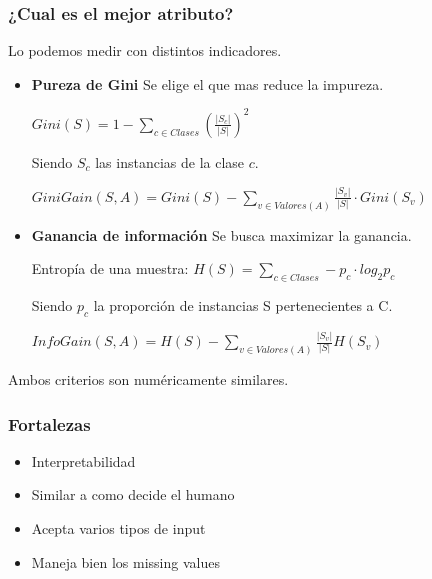 \documentclass[titlepage,a4paper]{article}
\begin{document}
\subsubsection*{¿Cual es el mejor atributo?}
Lo podemos medir con distintos indicadores.
\begin{itemize}
    \item \textbf{Pureza de Gini} Se elige el que mas reduce la impureza. 
    
    \begin{math}
    Gini(S) = 1 - \sum_{c\in Clases}(\frac{|S_c|}{|S|})^2
    \end{math}
    
    Siendo $S_c$ las instancias de la clase $c$.
    
    \begin{math}
    GiniGain(S,A) = Gini(S) - \sum_{v\in Valores(A)}\frac{|S_v|}{|S|} \cdot Gini(S_v)
    \end{math}
    
    
    \item \textbf{Ganancia de información} Se busca maximizar la ganancia. 
    
    Entropía de una muestra:
    \begin{math}
    H(S) = \sum_{c\in Clases} - p_c \cdot log_2 p_c
    \end{math}
    
    Siendo $p_c$ la proporción de instancias S pertenecientes a C.
    
    \begin{math}
    InfoGain(S,A) = H(S) - \sum_{v\in Valores(A)} \frac{|S_v|}{|S|} H(S_v)
    \end{math}
    
\end{itemize}

Ambos criterios son numéricamente similares.


\subsubsection*{Fortalezas}

\begin{itemize}
    \item Interpretabilidad
    \item Similar a como decide el humano
    \item Acepta varios tipos de input
    \item Maneja bien  los missing values
\end{itemize}
\end{document}
